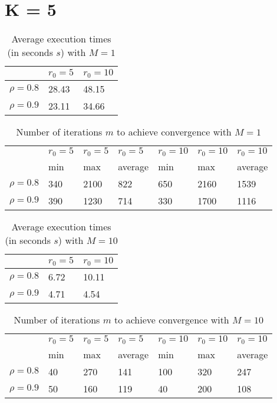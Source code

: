 \documentclass[a4paper,11pt,openright]{report}
\begin{document}
\section*{K = 5}
\begin{table}[H]
\centering
\addtolength{\leftskip}{-1.5cm}
\addtolength{\rightskip}{-1.5cm}
\begin{tabular}{|c|ll|}
\hline
$ $ & $r_0 = 5$ & $r_0 = 10$ \\
\hline
$\rho = 0.8$ & 28.43 & 48.15 \\

$\rho = 0.9$ & 23.11 & 34.66 \\
\hline
\end{tabular}
\caption{Average execution times (in seconds $s$) with $M = 1$}
\end{table}
\begin{table}[H]
\centering
\addtolength{\leftskip}{-1.5cm}
\addtolength{\rightskip}{-1.5cm}
\begin{tabular}{|c|llllll|}
\hline
$ $ & $r_0 = 5$ & $r_0 = 5$ & $r_0 = 5$ & $r_0 = 10$ & $r_0 = 10$ & $r_0 = 10$  \\
$ $ & min & max & average & min & max & average \\ 
\hline
$\rho = 0.8$ & 340 & 2100 & 822 & 650 & 2160 & 1539\\

$\rho = 0.9$ & 390 & 1230 & 714 & 330 & 1700 & 1116 \\
\hline
\end{tabular}
\caption{Number of iterations $m$ to achieve convergence with $M = 1$}
\end{table}
\begin{table}[H]
\centering
\addtolength{\leftskip}{-1.5cm}
\addtolength{\rightskip}{-1.5cm}
\begin{tabular}{|c|ll|}
\hline
$ $ & $r_0 = 5$ & $r_0 = 10$ \\
\hline
$\rho = 0.8$ & 6.72 & 10.11 \\

$\rho = 0.9$ & 4.71 & 4.54 \\
\hline
\end{tabular}
\caption{Average execution times (in seconds $s$) with $M = 10$}
\end{table}
\begin{table}[H]
\centering
\addtolength{\leftskip}{-1.5cm}
\addtolength{\rightskip}{-1.5cm}
\begin{tabular}{|c|llllll|}
\hline
$ $ & $r_0 = 5$ & $r_0 = 5$ & $r_0 = 5$ & $r_0 = 10$ & $r_0 = 10$ & $r_0 = 10$ \\
$ $ & min & max & average & min & max & average \\
\hline
$\rho = 0.8$ & 40 & 270 & 141 & 100 & 320 & 247 \\

$\rho = 0.9$ & 50 & 160 & 119 & 40 & 200 & 108 \\
\hline
\end{tabular}
\caption{Number of iterations $m$ to achieve convergence with $M = 10$}
\end{table}
\end{document}
